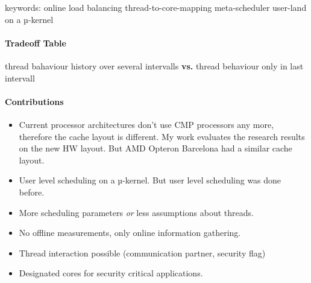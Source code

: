 keywords:
online
load balancing
thread-to-core-mapping
meta-scheduler
user-land
on a $µ$-kernel

\paragraph{Tradeoff Table}
thread bahaviour history over several intervalls
\textbf{vs.}
thread behaviour only in last intervall


\paragraph{Contributions}
\begin{itemize}
  \item Current processor architectures don't use CMP processors any more, therefore
    the cache layout is different. My work evaluates the research results on the
    new HW layout. But AMD Opteron Barcelona had a similar cache layout.
  \item User level scheduling on a $µ$-kernel. But user level scheduling was
    done before.
  \item More scheduling parameters \textit{or} less assumptions about threads.
  \item No offline measurements, only online information gathering.
  \item Thread interaction possible (communication partner, security flag)
  \item Designated cores for security critical applications.
\end{itemize}
